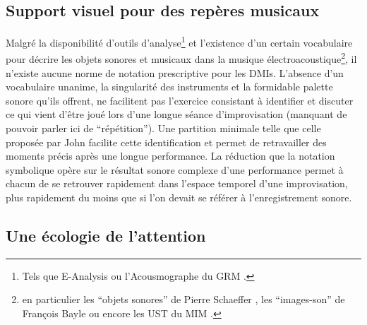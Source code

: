 \subsection{Support visuel pour des repères musicaux}

\noindent Malgré la disponibilité d'outils d'analyse\footnote{Tels que E-Analysis \cite{couprie_eanalysis:_2016} ou l'Acousmographe du \gls{GRM} \cite{favreau_lacousmographe_2010}.} et l'existence d'un certain vocabulaire pour décrire les objets sonores et musicaux dans la musique électroacoustique\footnote{en particulier les ``objets sonores'' de Pierre Schaeffer \cite{schaeffer_traite_1966}, les ``images-son'' de François Bayle \cite{bayle_musique_1993} ou encore les \gls{UST} du \gls{MIM} \cite{delalande_les_1996}.}, il n'existe aucune norme de notation prescriptive pour les \glspl{DMI}. L'absence d'un vocabulaire unanime, la singularité des instruments et la formidable palette sonore qu'ils offrent, ne facilitent pas l'exercice consistant à identifier et discuter ce qui vient d'être joué lors d'une longue séance d'improvisation (manquant de pouvoir parler ici de ``répétition''). Une partition minimale telle que celle proposée par John facilite cette identification et permet de retravailler des moments précis après une longue performance. La réduction que la notation symbolique opère sur le résultat sonore complexe d'une performance permet à chacun de se retrouver rapidement dans l'espace temporel d'une improvisation, plus rapidement du moins que si l'on devait se référer à l'enregistrement sonore.

\subsection{Une écologie de l'attention}

